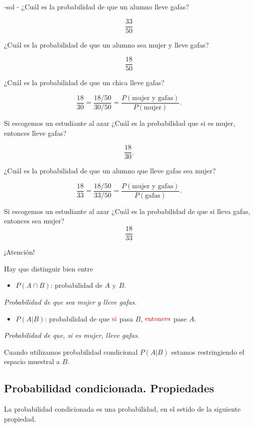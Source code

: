 \documentclass[
  letterpaper,
  DIV=11,
  numbers=noendperiod]{scrreprt}
\providecommand{\tightlist}{%
  \setlength{\itemsep}{0pt}\setlength{\parskip}{0pt}}\usepackage{longtable,booktabs,array}
\begin{document}
-sol - ¿Cuál es la probabilidad de que un alumno lleve gafas?

\[
\frac{33}{50}
\]

¿Cuál es la probabilidad de que un alumno sea mujer y lleve gafas?

\[
\frac{18}{50}
\]

¿Cuál es la probabilidad de que un chica lleve gafas?

\[
\frac{18}{30}=\frac{18/50}{30/50}=\frac{P(\mbox{mujer  y gafas})}{P(\mbox{mujer})}.
\]

Si escogemos un estudiante al azar ¿Cuál es la probabilidad que si es
mujer, entonces lleve gafas?

\[
\frac{18}{30}.
\]

¿Cuál es la probabilidad de que un alumno que lleve gafas sea mujer?

\[
\frac{18}{33}=\frac{18/50}{33/50}=\frac{P(\mbox{mujer y gafas})}{P(\mbox{gafas})}.
\]

Si escogemos un estudiante al azar ¿Cuál es la probabilidad de que si
lleva gafas, entonces sea mujer? \[
    \frac{18}{33}
    \]

¡Atención!

Hay que distinguir bien entre

\begin{itemize}
\tightlist
\item
  \(P(A\cap B)\): probabilidad de \(A\) \(\color{red}{\text{y}}\) \(B\).
\end{itemize}

\emph{Probabilidad de que sea mujer y lleve gafas.}

\begin{itemize}
\tightlist
\item
  \(P(A|B)\): probabilidad de que \(\color{red}{\text{si}}\) pasa \(B\),
  \(\color{red}{\text{entonces}}\) pase \(A\).
\end{itemize}

\emph{Probabilidad de que, si es mujer, lleve gafas.}

Cuando utilizamos probabilidad condicional \(P(A|B)\) estamos
restringiendo el espacio muestral a \(B\).

\subsection{Probabilidad condicionada.
Propiedades}\label{probabilidad-condicionada.-propiedades}

La probabilidad condicionada es una probabilidad, en el setido de la
siguiente propiedad.
\end{document}
